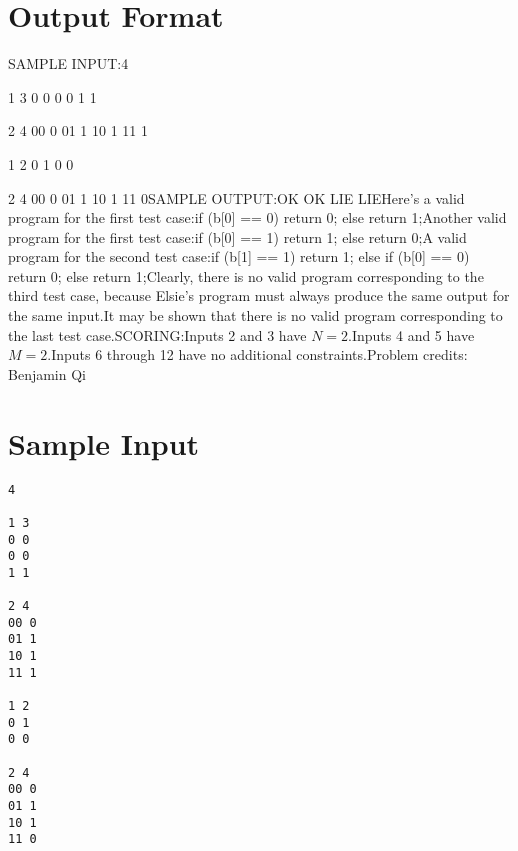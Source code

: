 \documentclass[12pt]{article}
\begin{document}
\section*{Output Format}
SAMPLE INPUT:4

1 3
0 0
0 0
1 1

2 4
00 0
01 1
10 1
11 1

1 2
0 1
0 0

2 4
00 0
01 1
10 1
11 0SAMPLE OUTPUT:OK
OK
LIE
LIEHere's a valid program for the first test case:if (b[0] == 0) return 0;
else return 1;Another valid program for the first test case:if (b[0] == 1) return 1;
else return 0;A valid program for the second test case:if (b[1] == 1) return 1;
else if (b[0] == 0) return 0;
else return 1;Clearly, there is no valid program corresponding to the third test case, because
Elsie's program must always produce the same output for the same input.It may be shown that there is no valid program corresponding to the last test
case.SCORING:Inputs 2 and 3 have $N = 2$.Inputs 4 and 5 have $M = 2$.Inputs 6 through 12 have no additional constraints.Problem credits: Benjamin Qi

\section*{Sample Input}
\begin{verbatim}
4

1 3
0 0
0 0
1 1

2 4
00 0
01 1
10 1
11 1

1 2
0 1
0 0

2 4
00 0
01 1
10 1
11 0
\end{verbatim}
\end{document}
